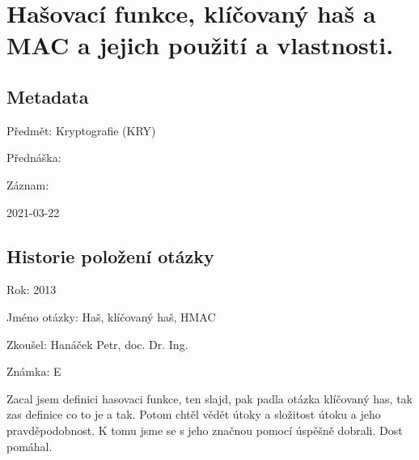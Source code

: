 

\graphicspath{{kry/hasovaci_funkce}}


\chapter{Hašovací funkce, klíčovaný haš a MAC a jejich použití a vlastnosti.}


\section{Metadata}

\begin{compactitem}
    \item Předmět: Kryptografie (KRY)
    \item Přednáška:
    \begin{compactitem}
        \item {}
    \end{compactitem}
    \item Záznam:
    \begin{compactitem}
        \item 2021-03-22
    \end{compactitem}
\end{compactitem}


\section{Historie položení otázky}

\begin{compactitem}
    \item Rok: 2013
    \item Jméno otázky: Haš, klíčovaný haš, HMAC
    \item Zkoušel: Hanáček Petr, doc. Dr. Ing.
    \item Známka: E
    \item Zacal jsem definici hasovaci funkce, ten slajd, pak padla otázka klíčovaný has, tak zas definice co to je a tak. Potom chtěl vědět útoky a složitost útoku a jeho pravděpodobnost. K tomu jsme se s jeho značnou pomocí úspěšně dobrali. Dost pomáhal.
\end{compactitem}


